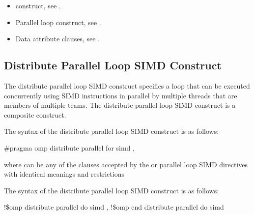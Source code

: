 \crossreferences
\begin{itemize}
\item {} construct, see 
.

\item Parallel loop construct, see 
.

\item Data attribute clauses, see 
.
\end{itemize}









\subsection{Distribute Parallel Loop SIMD Construct}
\label{subsec:Distribute Parallel Loop SIMD Construct}
\summary
The distribute parallel loop SIMD construct specifies a loop that can be executed 
concurrently using SIMD instructions in parallel by multiple threads that are members 
of multiple teams. The distribute parallel loop SIMD construct is a composite construct.

\syntax
\ccppspecificstart
The syntax of the distribute parallel loop SIMD construct is as follows:

\begin{boxedcode}
\#pragma omp distribute parallel for simd \plc{[clause[ [},\plc{] clause] ... ]}
\end{boxedcode}

where  can be any of the clauses accepted by the  or parallel loop 
SIMD directives with identical meanings and restrictions
\ccppspecificend

\fortranspecificstart
The syntax of the distribute parallel loop SIMD construct is as follows:

\begin{boxedcode}
!\$omp distribute parallel do simd \plc{[clause[ [},\plc{] clause] ... ]}
\plc{[}!\$omp end distribute parallel do simd\plc{]}
\end{boxedcode}

